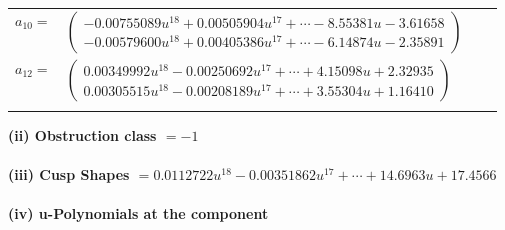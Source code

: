 \documentclass[1p]{elsarticle_modified}
\theoremstyle{definition}
\begin{document}
\begin{tabular}{m{7pt} m{180pt} m{7pt} m{180pt} }
\flushright $a_{10}=$&$\begin{pmatrix}-0.00755089 u^{18}+0.00505904 u^{17}+\cdots-8.55381 u-3.61658\\-0.00579600 u^{18}+0.00405386 u^{17}+\cdots-6.14874 u-2.35891\end{pmatrix}$ \\
\flushright $a_{12}=$&$\begin{pmatrix}0.00349992 u^{18}-0.00250692 u^{17}+\cdots+4.15098 u+2.32935\\0.00305515 u^{18}-0.00208189 u^{17}+\cdots+3.55304 u+1.16410\end{pmatrix}$\\&\end{tabular}
\flushleft \textbf{(ii) Obstruction class $= -1$}\\~\\
\flushleft \textbf{(iii) Cusp Shapes $= 0.0112722 u^{18}-0.00351862 u^{17}+\cdots+14.6963 u+17.4566$}\\~\\
\newpage\renewcommand{\arraystretch}{1}
\flushleft \textbf{(iv) u-Polynomials at the component}\newline \\
\end{document}
